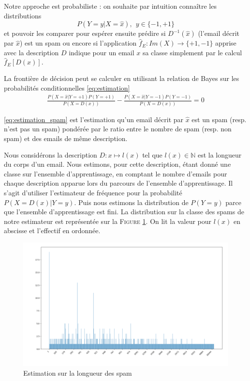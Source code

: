 \documentclass[a4paper, french]{article}
\begin{document}
Notre approche est probabiliste : on souhaite par intuition conna\^itre les distributions 
\label{eq:estimation}
\begin{equation}P(Y=y|X=\hat{x}),\ \ y\in\{-1,+1\}\end{equation}
et pouvoir les comparer pour esp\'erer ensuite pr\'edire si $D^{-1}(\hat{x})$ (l'email d\'ecrit par $\hat{x}$) est un spam ou encore si l'application $\hat{f}_E\colon Im(X)\rightarrow \{+1,-1\}$ apprise avec la description $D$ indique pour un email $x$ sa classe simplement par le calcul $\hat{f}_E[ D(x)]$.

La fronti\`ere de d\'ecision peut se calculer en utilisant la relation de Bayes sur les probabilit\'es conditionnelles \eqref{eq:estimation}
\begin{align}
\label{eq:estimation_spam}
\frac{P(X=\hat{x}|Y=+1)P(Y=+1)}{P(X=D(x))}
- \frac{P(X=\hat{x}|Y=-1)P(Y=-1)}{P(X=D(x))}=0
\end{align}

\eqref{eq:estimation_spam} est l'estimation qu'un email d\'ecrit par $\hat{x}$ est un spam (resp. n'est pas un spam) pond\'er\'ee par le ratio entre le nombre de spam (resp. non spam) et des emails de m\^eme description.

Nous consid\'erons la description $D\colon x\mapsto l(x)$ 
tel que $l(x)\in \mathbb{N}$ est la longueur du corps d'un email. 
Nous estimons, pour cette description, \'etant donn\'e une classe 
sur l'ensemble d'apprentissage, en comptant le nombre d'emails 
pour chaque description apparue lors du parcours de l'ensemble d'apprentissage. 
Il s'agit d'utiliser l'estimateur de fr\'equence pour la probabilit\'e 
$P(X=D(x)|Y=y)$. Puis nous estimons la distribution de $P(Y=y)$ parce que 
l'ensemble d'apprentissage est fini. 
La distribution sur la classe des spams de notre estimateur est 
repr\'esent\'ee sur la F\textsc{igure} \ref{fig:histo1spam}.
On lit la valeur pour $l(x)$ en abscisse et l'effectif en ordonn\'ee.

\begin{figure}[h]
\begin{center}
    \caption{Estimation sur la longueur des spam}
    \label{fig:histo1spam}
    \includegraphics[width=13cm]{histo}
\end{center}
\end{figure}
\end{document}
